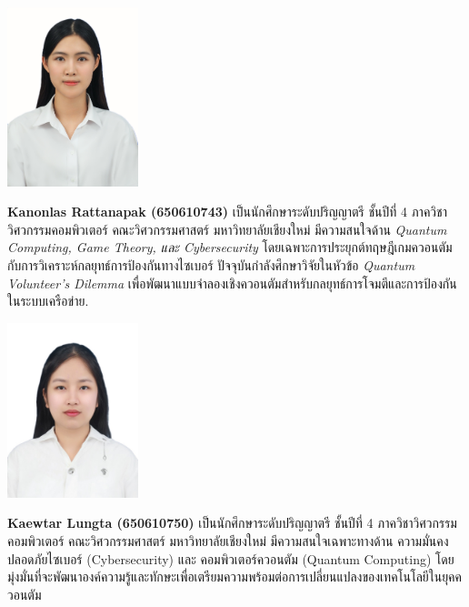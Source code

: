 \documentclass[semifinal]{cpecmu}
\author{นางสาวกนลลัส รัตนภาค}{Kanonlas Rattanapak}{650610743}
\author{นางสาวแก้วตา ลุงต๊ะ}{Kaewtar Lungta}{650610750}
\author{นายธีระพันธุ์ พันธุ์วรรธนะสิน}{Theeraphan Phanwattanasin}{650610773}
\begin{document}


\pagestyle{empty}\cleardoublepage
\normalspacing \setcounter{page}{1}  \pagestyle{cpecmu}





\ifproject

\fi



\ifproject
\normalspacing
\appendix


\ifglossary\glossarypage\fi

\ifindex\indexpage\fi

\begin{biosketch}
\begin{center}
  \includegraphics[width=1.5in]{0743.jpeg}
\end{center}
\textbf{Kanonlas Rattanapak (650610743)} เป็นนักศึกษาระดับปริญญาตรี ชั้นปีที่ 4 
ภาควิชาวิศวกรรมคอมพิวเตอร์ คณะวิศวกรรมศาสตร์ มหาวิทยาลัยเชียงใหม่
มีความสนใจด้าน \textit{Quantum Computing, Game Theory, และ Cybersecurity}
โดยเฉพาะการประยุกต์ทฤษฎีเกมควอนตัมกับการวิเคราะห์กลยุทธ์การป้องกันทางไซเบอร์
ปัจจุบันกำลังศึกษาวิจัยในหัวข้อ \textit{Quantum Volunteer's Dilemma}
เพื่อพัฒนาแบบจำลองเชิงควอนตัมสำหรับกลยุทธ์การโจมตีและการป้องกันในระบบเครือข่าย.

\begin{center}
  \includegraphics[width=1.5in]{0750.jpg}
\end{center}
\textbf{Kaewtar Lungta (650610750)} เป็นนักศึกษาระดับปริญญาตรี ชั้นปีที่ 4 
ภาควิชาวิศวกรรมคอมพิวเตอร์ คณะวิศวกรรมศาสตร์ มหาวิทยาลัยเชียงใหม่ มีความสนใจเฉพาะทางด้าน ความมั่นคงปลอดภัยไซเบอร์ (Cybersecurity) และ คอมพิวเตอร์ควอนตัม (Quantum Computing)
โดยมุ่งมั่นที่จะพัฒนาองค์ความรู้และทักษะเพื่อเตรียมความพร้อมต่อการเปลี่ยนแปลงของเทคโนโลยีในยุคควอนตัม
\end{biosketch}
\fi %
\end{document}
